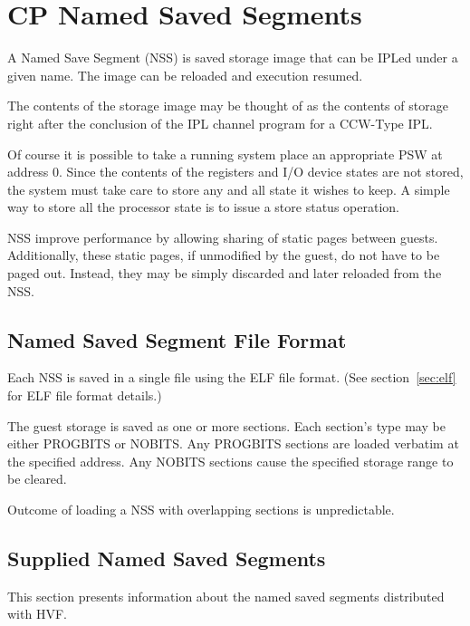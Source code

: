 \chapter{CP Named Saved Segments}
\label{chap:nss}
\cbstart
{}

A Named Save Segment (NSS) is saved storage image that can be IPLed under a
given name.  The image can be reloaded and execution resumed.

The contents of the storage image may be thought of as the contents of
storage right after the conclusion of the IPL channel program for a CCW-Type
IPL.

Of course it is possible to take a running system place an appropriate PSW
at address 0.  Since the contents of the registers and I/O device states are
not stored, the system must take care to store any and all state it wishes
to keep.  A simple way to store all the processor state is to issue a store
status operation.

NSS improve performance by allowing sharing of static pages between guests.
Additionally, these static pages, if unmodified by the guest, do not have to
be paged out.  Instead, they may be simply discarded and later reloaded from
the NSS.

\section{Named Saved Segment File Format}
Each NSS is saved in a single file using the ELF file format.  (See
section~\ref{sec:elf} for ELF file format details.)

The guest storage is saved as one or more sections. Each section's type may
be either PROGBITS or NOBITS.  Any PROGBITS sections are loaded verbatim at
the specified address.  Any NOBITS sections cause the specified storage
range to be cleared.

Outcome of loading a NSS with overlapping sections is unpredictable.

\section{Supplied Named Saved Segments}
This section presents information about the named saved segments
distributed with HVF.


\cbend
